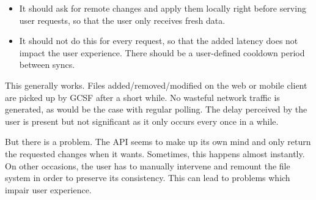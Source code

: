\begin{itemize}
  \itemsep0em
  \item It should ask for remote changes and apply them locally right before serving user requests, so that the user only receives fresh data.
  \item It should not do this for every request, so that the added latency does not impact the user experience. There should be a user-defined cooldown period between syncs.
\end{itemize}

This generally works. Files added/removed/modified on the web or mobile client are picked up by GCSF after a short while. No wasteful network traffic is generated, as would be the case with regular polling. The delay perceived by the user is present but not significant as it only occurs every once in a while.

But there is a problem. The API seems to make up its own mind and only return the requested changes when it wants. Sometimes, this happens almost instantly. On other occasions, the user has to manually intervene and remount the file system in order to preserve its consistency. This can lead to problems which impair user experience.
